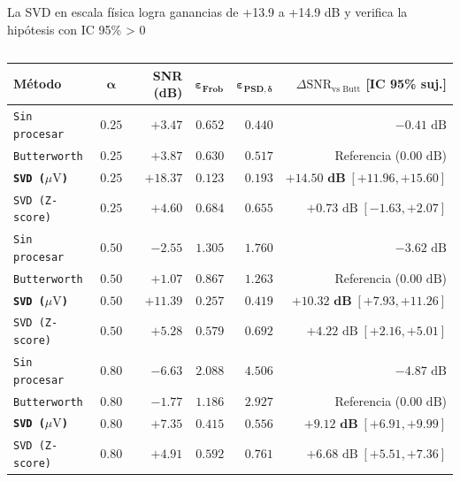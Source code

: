 \documentclass[aspectratio=169,9pt]{beamer}
\begin{document}
\begin{frame}{La SVD en escala f\'isica logra ganancias de +13.9 a +14.9 dB y verifica la hip\'otesis con IC 95\% > 0}
\begin{columns}[T,onlytextwidth]
    \begin{column}{0.49\textwidth}
      \begin{tcolorbox}[basecard, title={\scriptsize\bfseries Desempe\~no en Canal Frontal \texttt{Fpz-Cz} ($N_{\text{eval}}=183$ \'epocas)}, colbacktitle=UDTeal!85!black, coltitle=white]
        \tiny
        \setlength{\tabcolsep}{2.2pt}
        \renewcommand{\arraystretch}{1.06}
        \begin{tabularx}{\linewidth}{@{}Y c r r r r@{}}
          \toprule
          \textbf{M\'etodo} & $\boldsymbol{\alpha}$ & \textbf{SNR (dB)} & $\boldsymbol{\varepsilon_{\text{Frob}}}$ & $\boldsymbol{\varepsilon_{\text{PSD},\delta}}$ & \textbf{$\Delta\text{SNR}_{\text{vs Butt}}$ [IC 95\% suj.]} \\
          \midrule
          \texttt{Sin procesar} & $0.25$ & $+3.47$ & $0.652$ & $0.440$ & $-0.41\text{ dB}$ \\
          \texttt{Butterworth} & $0.25$ & $+3.87$ & $0.630$ & $0.517$ & Referencia ($0.00\text{ dB}$) \\
          \textbf{\texttt{SVD ($\mu\text{V}$)}} & $\mathbf{0.25}$ & $\mathbf{+18.37}$ & $\mathbf{0.123}$ & $\mathbf{0.193}$ & $\mathbf{+14.50\text{ dB}\;[+11.96, +15.60]}$ \\
          \texttt{SVD (Z-score)} & $0.25$ & $+4.60$ & $0.684$ & $0.655$ & $+0.73\text{ dB}\;[-1.63, +2.07]$ \\
          \midrule
          \texttt{Sin procesar} & $0.50$ & $-2.55$ & $1.305$ & $1.760$ & $-3.62\text{ dB}$ \\
          \texttt{Butterworth} & $0.50$ & $+1.07$ & $0.867$ & $1.263$ & Referencia ($0.00\text{ dB}$) \\
          \textbf{\texttt{SVD ($\mu\text{V}$)}} & $\mathbf{0.50}$ & $\mathbf{+11.39}$ & $\mathbf{0.257}$ & $\mathbf{0.419}$ & $\mathbf{+10.32\text{ dB}\;[+7.93, +11.26]}$ \\
          \texttt{SVD (Z-score)} & $0.50$ & $+5.28$ & $0.579$ & $0.692$ & $+4.22\text{ dB}\;[+2.16, +5.01]$ \\
          \midrule
          \texttt{Sin procesar} & $0.80$ & $-6.63$ & $2.088$ & $4.506$ & $-4.87\text{ dB}$ \\
          \texttt{Butterworth} & $0.80$ & $-1.77$ & $1.186$ & $2.927$ & Referencia ($0.00\text{ dB}$) \\
          \textbf{\texttt{SVD ($\mu\text{V}$)}} & $\mathbf{0.80}$ & $\mathbf{+7.35}$ & $\mathbf{0.415}$ & $\mathbf{0.556}$ & $\mathbf{+9.12\text{ dB}\;[+6.91, +9.99]}$ \\
          \texttt{SVD (Z-score)} & $0.80$ & $+4.91$ & $0.592$ & $0.761$ & $+6.68\text{ dB}\;[+5.51, +7.36]$ \\
          \bottomrule
        \end{tabularx}
      \end{tcolorbox}


\end{column}
\end{columns}
\end{frame}
\end{document}
